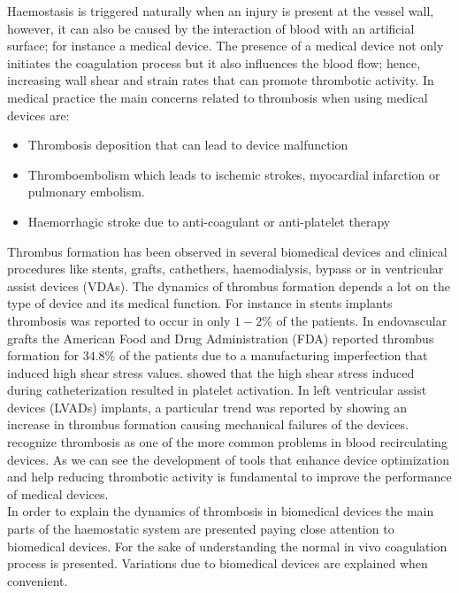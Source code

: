 \documentclass[%
 nofootinbib,
 amsmath,amssymb,
 aps,
 pra,
]{revtex4-1}
\begin{document}
Haemostasis is triggered naturally when an injury is present at the vessel wall, however, it can also be caused by the interaction of blood with an artificial surface; for instance a medical device. The presence of a medical device not only initiates the coagulation process but it also influences the blood flow; hence, increasing wall shear and strain rates that can promote thrombotic activity. 
In medical practice the main concerns related to thrombosis when using medical devices are:
\begin{itemize}
\item Thrombosis deposition that can lead to device malfunction
\item Thromboembolism which leads to ischemic strokes, myocardial infarction or pulmonary embolism.
\item Haemorrhagic stroke due to anti-coagulant or anti-platelet therapy 
\end{itemize}
Thrombus formation has been observed in several biomedical devices and clinical procedures like stents, grafts, cathethers, haemodialysis, bypass or in %
ventricular assist devices (VDAs). The dynamics of thrombus formation depends a lot on the type of device and its medical function. For instance in stents implants \citet{Wilson:2013} thrombosis was reported to occur in only $1-2 \%$ of the patients. In endovascular grafts the American %
Food and Drug Administration (FDA) reported thrombus formation for $34.8\%$ of the patients due to a manufacturing imperfection that induced high shear stress values. \citet{Chan:2009} showed that the high shear stress induced during catheterization resulted in platelet activation. In %
left ventricular assist devices (LVADs) implants, a particular trend was reported by \citet{Mehra:2014} showing an increase in thrombus formation causing mechanical failures of the devices. \citet{Bluestein:2010} recognize thrombosis as one of the more common problems in blood recirculating devices. As we can see  the development of tools that enhance device optimization and help reducing thrombotic activity is fundamental to improve the performance of medical devices.\\ 
In order to explain the dynamics of thrombosis in biomedical devices the main parts of the haemostatic system are presented paying close attention to biomedical devices. For the sake of understanding the normal in vivo coagulation process is presented. Variations due to biomedical devices are explained when convenient. 
\end{document}
